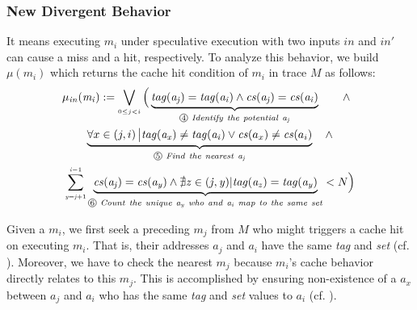 \documentclass[sigconf]{acmart}
\newcommand*\circled[1]{\tikz[baseline=(char.base)]{
				\node[shape=circle,draw,inner sep=.4pt] (char) {\scriptsize{#1}};}}
\begin{document}
\subsubsection{New Divergent Behavior}
\label{sec:new_div}
It means executing $\mathit{m_i}$ under speculative execution with two inputs 
$\mathit{in}$ and $\mathit{in'}$ can cause a miss and a hit, respectively. To
analyze this behavior, we build $\mathit{\mu(m_i)}$ which returns the cache hit
condition of $\mathit{m_i}$ in trace $\mathit{M}$ as follows:
%
%
\begin{multline}
  \label{eqn:hc}
    \mathit{\mu_{in}(m_i)}:=
    \bigvee_{{\scriptscriptstyle 0{\leq}j<i}}
    \Big(
    \underbrace{
      \mathit{tag(a_j)}=\mathit{tag(a_i)} 
			\wedge 
      \mathit{cs(a_j)}=\mathit{cs(a_i)} 
    }_{{\circled{4}}\mathit{~Identify~the~potential~a_j}}
    ~~~~~~\wedge 
		~~\\
    \underbrace{
      {\forall}x\in\left(j,i\right)\big |\mathit{tag(a_x)}\ne\mathit{tag(a_i)}
      \vee 
      \mathit{cs}(a_x)\ne\mathit{cs}(a_i)
    }_{{\circled{5}}\mathit{~Find~the~nearest~a_j}}
		~~~\wedge 
		\\
    \sum_{{\scriptscriptstyle \mathit{y=j}+1}}^{{\scriptscriptstyle \mathit{i-}1}} 
    \underbrace{
      \mathit{cs(a_j)}=\mathit{cs(a_y)} 
      \wedge
      \nexists\mathit{z}\in(\mathit{j,y})|\mathit{tag(a_z)}=\mathit{tag(a_y)}
    }_{{\circled{6}}\mathit{~Count~the~unique~a_y~who~and~a_i~map~to~the~same~set}}
    <N 
    \Big)
\end{multline}
\vspace{.8ex}
%
%

Given a $\mathit{m_i}$, we first seek a preceding $\mathit{m_j}$ from 
$\mathit{M}$ who might triggers a cache hit on executing $\mathit{m_i}$. 
That is, their addresses $\mathit{a_j}$ and $\mathit{a_i}$ have the same 
\emph{tag} and \emph{set} (cf. \circled{4}). Moreover, we have to check 
the nearest $\mathit{m_j}$ because $\mathit{m_i}$'s cache behavior directly 
relates to this $\mathit{m_j}$. This is accomplished by ensuring non-existence 
of a $\mathit{a_x}$ between $\mathit{a_j}$ and $\mathit{a_i}$ who has the same 
\textit{tag} and \textit{set} values to $\mathit{a_i}$ (cf. \circled{5}).
\end{document}
